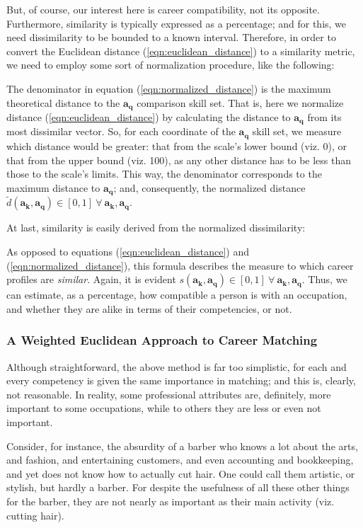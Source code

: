 \documentclass{article}
\begin{document}
But, of course, our interest here is career compatibility, not its opposite.
Furthermore, similarity is typically expressed as a percentage; and for this,
we need dissimilarity to be bounded to a known interval. Therefore, in order to
convert the Euclidean distance (\ref{eqn:euclidean_distance}) to a similarity
metric, we need to employ some sort of normalization procedure, like the
following: \EqnNormalizedDistance

The denominator in equation (\ref{eqn:normalized_distance}) is the maximum
theoretical distance to the $\boldsymbol{a_q}$ comparison skill set. That is,
here we normalize distance (\ref{eqn:euclidean_distance}) by calculating the
distance to $\boldsymbol{a_q}$ from its most dissimilar vector. So, for each
coordinate of the $\boldsymbol{a_{q}}$ skill set, we measure which distance
would be greater: that from the scale's lower bound (viz. 0), or that from the
upper bound (viz. 100), as any other distance has to be less than those to the
scale's limits. This way, the denominator corresponds to the maximum distance
to $\boldsymbol{a_{q}}$; and, consequently, the normalized distance
$\tilde{d}(\boldsymbol{a_{\boldsymbol{k}}}, \boldsymbol{a_{q}}) \in [0,1] \
    \forall \ \boldsymbol{a_{\boldsymbol{k}}}, \boldsymbol{a_{q}}$.

At last, similarity is easily derived from the normalized dissimilarity:
\EqnSimilarity

As opposed to equations (\ref{eqn:euclidean_distance}) and
(\ref{eqn:normalized_distance}), this formula describes the measure to which
career profiles are \textit{similar}. Again, it is evident
$s(\boldsymbol{a_{\boldsymbol{k}}}, \boldsymbol{a_{q}}) \in [0,1] \ \forall \
    \boldsymbol{a_{\boldsymbol{k}}}, \boldsymbol{a_{q}}$. Thus, we can estimate, as
a percentage, how compatible a person is with an occupation, and whether they
are alike in terms of their competencies, or not.

\subsubsection{A Weighted Euclidean Approach to Career Matching}
Although straightforward, the above method is far too simplistic, for each and
every competency is given the same importance in matching; and this is,
clearly, not reasonable. In reality, some professional attributes are,
definitely, more important to some occupations, while to others they are less
or even not important.

Consider, for instance, the absurdity of a barber who knows a lot about the
arts, and fashion, and entertaining customers, and even accounting and
bookkeeping, and yet does not know how to actually cut hair. One could call
them artistic, or stylish, but hardly a barber. For despite the usefulness of
all these other things for the barber, they are not nearly as important as
their main activity (viz. cutting hair).
\end{document}
